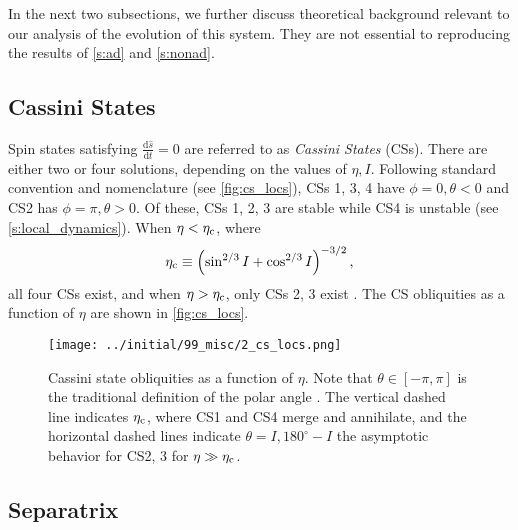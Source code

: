 \documentclass[
        fleqn,
        usenatbib,
        referee,
    ]{mnras}
\newcommand*{\rd}[2]{\frac{\mathrm{d}#1}{\mathrm{d}#2}}
\newcommand*{\p}[1]{\left(#1\right)}
\begin{document}
In the next two subsections, we further discuss theoretical background relevant
to our analysis of the evolution of this system. They are not essential to
reproducing the results of \autoref{s:ad} and \autoref{s:nonad}.

\subsection{Cassini States}\label{ss:cs}

Spin states satisfying $\rd{\hat{s}}{t} = 0$ are referred to as \emph{Cassini
States} (CSs). There are either two or four solutions, depending on the values
of $\eta, I$. Following standard convention and nomenclature (see
\autoref{fig:cs_locs}), CSs 1, 3, 4 have $\phi = 0, \theta < 0$ and CS2 has
$\phi = \pi, \theta > 0$. Of these, CSs 1, 2, 3 are stable while CS4 is unstable
(see \autoref{s:local_dynamics}). When $\eta < \eta_{\rm c}$, where
\begin{equation}
    \eta_{\rm c} \equiv \p{\sin^{2/3}I + \cos^{2/3}I}^{-3/2},
\end{equation}
all four CSs exist, and when $\eta > \eta_{\rm c}$, only CSs 2, 3 exist
\citep{henrard1987,ward2004I}. The CS obliquities as a function of $\eta$ are
shown in \autoref{fig:cs_locs}.
\begin{figure}
    \centering
    \texttt{[image: ../initial/99\_misc/2\_cs\_locs.png]}
    \caption{Cassini state obliquities as a function of $\eta$. Note that
    $\theta \in [-\pi, \pi]$ is the traditional definition of the polar angle
    \citep[see e.g.][]{colombo1966,peale1969,henrard1987}. The vertical dashed
    line indicates $\eta_{\rm c}$, where CS1 and CS4 merge and annihilate, and the
    horizontal dashed lines indicate $\theta = I, 180^\circ - I$ the asymptotic
    behavior for CS2, 3 for $\eta \gg \eta_{\rm c}$.}\label{fig:cs_locs}
\end{figure}

\subsection{Separatrix}
\end{document}
